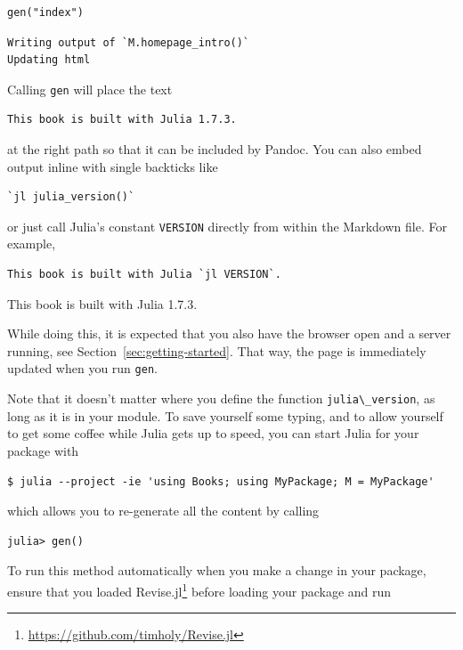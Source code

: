 \documentclass[
  notoc %
]{tufte-book}
\DeclareRobustCommand{\href}[2]{#2\footnote{\url{#1}}}
\newcommand{\passthrough}[1]{#1}
\begin{document}
\begin{lstlisting}
gen("index")
\end{lstlisting}

\begin{lstlisting}[language=Output]
Writing output of `M.homepage_intro()`
Updating html
\end{lstlisting}

Calling \passthrough{\lstinline!gen!} will place the text

\begin{lstlisting}
This book is built with Julia 1.7.3.
\end{lstlisting}

at the right path so that it can be included by Pandoc. You can also
embed output inline with single backticks like

\begin{lstlisting}
`jl julia_version()`
\end{lstlisting}

or just call Julia's constant \passthrough{\lstinline!VERSION!} directly
from within the Markdown file. For example,

\begin{lstlisting}
This book is built with Julia `jl VERSION`.
\end{lstlisting}

This book is built with Julia 1.7.3.

While doing this, it is expected that you also have the browser open and
a server running, see Section~\ref{sec:getting-started}. That way, the
page is immediately updated when you run \passthrough{\lstinline!gen!}.

Note that it doesn't matter where you define the function
\passthrough{\lstinline!julia\_version!}, as long as it is in your
module. To save yourself some typing, and to allow yourself to get some
coffee while Julia gets up to speed, you can start Julia for your
package with

\begin{lstlisting}
$ julia --project -ie 'using Books; using MyPackage; M = MyPackage'
\end{lstlisting}

which allows you to re-generate all the content by calling

\begin{lstlisting}
julia> gen()
\end{lstlisting}

To run this method automatically when you make a change in your package,
ensure that you loaded
\href{https://github.com/timholy/Revise.jl}{Revise.jl} before loading
your package and run
\end{document}
